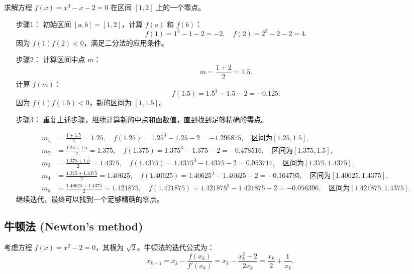 \begin{example}
    求解方程 $f(x) = x^3 - x - 2 = 0$ 在区间 $[1, 2]$ 上的一个零点。
\begin{solution}
\begin{enumerate}
    \item[步骤1：] 初始区间 $[a, b] = [1, 2]$，计算 $f(a)$ 和 $f(b)$：
    \[
    f(1) = 1^3 - 1 - 2 = -2, \quad f(2) = 2^3 - 2 - 2 = 4.
    \]
    因为 $f(1)f(2) < 0$，满足二分法的应用条件。
    \item[步骤2：] 计算区间中点 $m$：
    \[
    m = \frac{1 + 2}{2} = 1.5.
    \]
    计算 $f(m)$：
    \[
    f(1.5) = 1.5^3 - 1.5 - 2 = -0.125.
    \]
    因为 $f(1)f(1.5) < 0$，新的区间为 $[1, 1.5]$。
    \item[步骤3：] 重复上述步骤，继续计算新的中点和函数值，直到找到足够精确的零点。

    \[
    \begin{aligned}
    m_1 &= \frac{1 + 1.5}{2} = 1.25, \quad f(1.25) = 1.25^3 - 1.25 - 2 = -1.296875, \quad \text{区间为} [1.25, 1.5], \\
    m_2 &= \frac{1.25 + 1.5}{2} = 1.375, \quad f(1.375) = 1.375^3 - 1.375 - 2 = -0.478516, \quad \text{区间为} [1.375, 1.5], \\
    m_3 &= \frac{1.375 + 1.5}{2} = 1.4375, \quad f(1.4375) = 1.4375^3 - 1.4375 - 2 = 0.053711, \quad \text{区间为} [1.375, 1.4375], \\
    m_4 &= \frac{1.375 + 1.4375}{2} = 1.40625, \quad f(1.40625) = 1.40625^3 - 1.40625 - 2 = -0.164795, \quad \text{区间为} [1.40625, 1.4375], \\
    m_5 &= \frac{1.40625 + 1.4375}{2} = 1.421875, \quad f(1.421875) = 1.421875^3 - 1.421875 - 2 = -0.056396, \quad \text{区间为} [1.421875, 1.4375].
    \end{aligned}
    \]
    继续迭代，最终可以找到一个足够精确的零点。
\end{enumerate}
\end{solution}

\end{example}

\subsection{牛顿法 (Newton's method)}
\label{sub:newton_method}





考虑方程 $f(x) = x^2 - 2 = 0$，其根为 $\sqrt{2}$。牛顿法的迭代公式为：
\[
x_{k+1} = x_k - \frac{f(x_k)}{f'(x_k)} = x_k - \frac{x_k^2 - 2}{2x_k} = \frac{x_k}{2} + \frac{1}{x_k}.
\]

